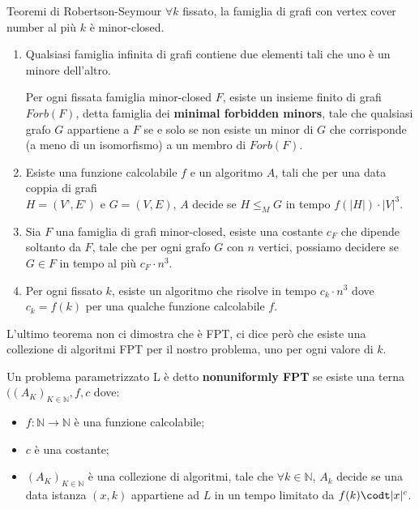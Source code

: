 \documentclass[10pt,a4paper]{article}
\begin{document}
\begin{multicols}{3}
\begin{textbox}{Teoremi di Robertson-Seymour}
\(\forall k\) fissato, la famiglia di grafi con vertex cover
number al più \(k\) è minor-closed.

\begin{enumerate}[leftmargin=*]
    \item Qualsiasi famiglia infinita di grafi contiene due elementi tali che uno è un minore dell’altro.
    
    Per ogni fissata famiglia minor-closed \(F\), esiste un insieme finito di grafi \(Forb(F)\), detta famiglia dei \textbf{minimal forbidden minors}, tale che qualsiasi grafo \(G\) appartiene a \(F\) se e solo se non esiste un minor di \(G\) che corrisponde (a meno di un isomorfismo) a un membro di \(Forb(F)\).
    \item Esiste una funzione calcolabile \(f\) e un algoritmo \(A\), tali che per una data coppia di grafi\\\(H=(V’,E’)\) e \(G=(V,E)\), \(A\) decide se \(H \leq_M G\) in tempo \(f(|H|)\cdot |V|^3\).
    \item Sia \(F\) una famiglia di grafi minor-closed, esiste una costante \(c_F\) che dipende soltanto da \(F\), tale che per ogni grafo \(G\) con \(n\) vertici, possiamo decidere se \(G\in F\) in tempo al più \(c_F\cdot n^3\).
    \item Per ogni fissato \(k\), esiste un algoritmo che risolve  in tempo \(c_k\cdot n^3\) dove \(c_k=f(k)\) per una qualche funzione calcolabile \(f\).
\end{enumerate}
L'ultimo teorema non ci dimostra che  è FPT, 
ci dice però che esiste una collezione di algoritmi FPT per
il nostro problema, uno per ogni valore di \(k\).

Un problema parametrizzato L è detto \textbf{nonuniformly FPT}
se esiste una terna \(((A_K)_{K\in \mathbb{N}},f,c\) dove:
\begin{itemize}[leftmargin=*]
    \item \(f:\mathbb{N} \rightarrow \mathbb{N}\) è una funzione calcolabile;
    \item \(c\) è una costante;
    \item \((A_K)_{K\in \mathbb{N}}\) è una collezione di algoritmi, tale che
    \(\forall k \in \mathbb{N}\), \(A_k\) decide se una data istanza \((x,k)\)
    appartiene ad \(L\) in un tempo limitato da \(f(k)\codt |x|^c\).
\end{itemize}
\end{textbox}


\end{multicols}
\end{document}
